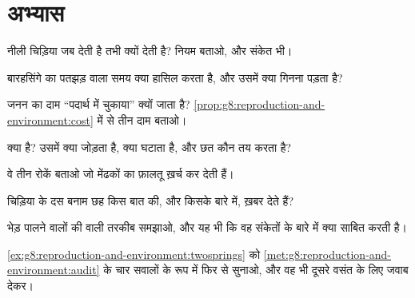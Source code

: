 \section{अभ्यास}

\begin{exercise}[$\star$]\label{exo:g8:reproduction-and-environment:1}
नीली चिड़िया जब  देती है तभी क्यों देती है? नियम बताओ, और संकेत भी।
\end{exercise}

\begin{exercise}[$\star$]\label{exo:g8:reproduction-and-environment:2}
बारहसिंगे का पतझड़ वाला समय क्या हासिल करता है, और उसमें क्या गिनना
पड़ता है?
\end{exercise}

\begin{exercise}[$\star$]\label{exo:g8:reproduction-and-environment:3}
जनन का दाम ``पदार्थ में चुकाया'' क्यों जाता है?
\cref{prop:g8:reproduction-and-environment:cost} में से तीन दाम बताओ।
\end{exercise}

\begin{exercise}[$\star$]\label{exo:g8:reproduction-and-environment:4}
 क्या है? उसमें क्या जोड़ता है, क्या घटाता है, और छत कौन तय करता
है?
\end{exercise}

\begin{exercise}[$\star$]\label{exo:g8:reproduction-and-environment:5}
वे तीन रोकें बताओ जो मेंढकों का फ़ालतू ख़र्च कर देती हैं।
\end{exercise}

\begin{exercise}[$\star$]\label{exo:g8:reproduction-and-environment:6}
चिड़िया के दस  बनाम छह  किस बात की, और किसके बारे में, ख़बर
देते हैं?
\end{exercise}

\begin{exercise}[$\star\star$]\label{exo:g8:reproduction-and-environment:7}
भेड़ पालने वालों की  वाली तरकीब समझाओ, और यह भी कि वह संकेतों के
बारे में क्या साबित करती है।
\end{exercise}

\begin{exercise}[$\star\star$]\label{exo:g8:reproduction-and-environment:8}
\cref{ex:g8:reproduction-and-environment:twosprings} को
\cref{met:g8:reproduction-and-environment:audit} के चार सवालों के रूप
में फिर से सुनाओ, और वह भी दूसरे वसंत के लिए जवाब देकर।
\end{exercise}

